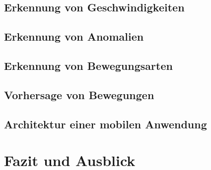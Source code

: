 \documentclass{hsflensburg}
\begin{document}
  \section{Erkennung von Geschwindigkeiten}
  \section{Erkennung von Anomalien}
  \section{Erkennung von Bewegungsarten}
  \section{Vorhersage von Bewegungen}
  \section{Architektur einer mobilen Anwendung}

  \chapter{Fazit und Ausblick}

  \printbibliography
\end{document}
